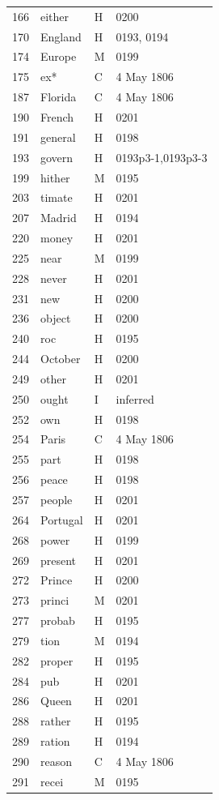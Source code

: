 \begin{longtable}{@{}rlll@{}}
166 & either & H & 0200 \\
170 & England & H & 0193, 0194 \\
174 & Europe & M & 0199 \\
175 & ex* & C & 4 May 1806 \\
187 & Florida & C & 4 May 1806 \\
190 & French & H & 0201 \\
191 & general & H & 0198 \\
193 & govern & H & 0193p3-1,0193p3-3 \\
199 & hither & M & 0195 \\
203 & timate & H & 0201 \\
207 & Madrid & H & 0194 \\
220 & money & H & 0201 \\
225 & near & M & 0199 \\
228 & never & H & 0201 \\
231 & new & H & 0200 \\
236 & object & H & 0200 \\
240 & roc & H & 0195 \\
244 & October & H & 0200 \\
249 & other & H & 0201 \\
250 & ought & I & inferred \\
252 & own & H & 0198 \\
254 & Paris & C & 4 May 1806 \\
255 & part & H & 0198 \\
256 & peace & H & 0198 \\
257 & people & H & 0201 \\
264 & Portugal & H & 0201 \\
268 & power & H & 0199 \\
269 & present & H & 0201 \\
272 & Prince & H & 0200 \\
273 & princi & M & 0201 \\
277 & probab & H & 0195 \\
279 & tion & M & 0194 \\
282 & proper & H & 0195 \\
284 & pub & H & 0201 \\
286 & Queen & H & 0201 \\
288 & rather & H & 0195 \\
289 & ration & H & 0194 \\
290 & reason & C & 4 May 1806 \\
291 & recei & M & 0195 \\

\end{longtable}
